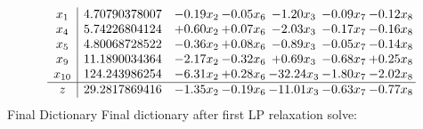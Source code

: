 \documentclass[8pt]{article}
\begin{document}
 \[\begin{array}{c| c c@{\hskip 2pt} c@{\hskip 2pt} c@{\hskip 2pt} c@{\hskip 2pt} c@{\hskip 2pt} }
 x_{1}   &  4.70790378007 & -0.19 x_{2} & -0.05 x_{6} & -1.20 x_{3} & -0.09 x_{7} & -0.12 x_{8}\\
 x_{4}   &  5.74226804124 & +  0.60 x_{2} & +  0.07 x_{6} & -2.03 x_{3} & -0.17 x_{7} & -0.16 x_{8}\\
 x_{5}   &  4.80068728522 & -0.36 x_{2} & +  0.08 x_{6} & -0.89 x_{3} & -0.05 x_{7} & -0.14 x_{8}\\
 x_{9}   &  11.1890034364 & -2.17 x_{2} & -0.32 x_{6} & +  0.69 x_{3} & -0.68 x_{7} & +  0.25 x_{8}\\
 x_{10}   &  124.243986254 & -6.31 x_{2} & +  0.28 x_{6} & -32.24 x_{3} & -1.80 x_{7} & -2.02 x_{8}\\
\hline
z    &  29.2817869416 & -1.35 x_{2} & -0.19 x_{6} & -11.01 x_{3} & -0.63 x_{7} & -0.77 x_{8}\\
\end{array}\]
Final Dictionary
Final dictionary after first LP relaxation solve: 
\end{document}
